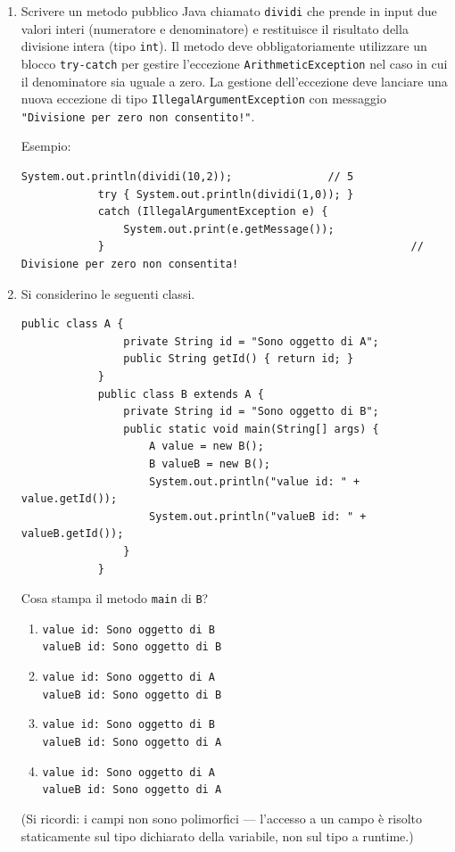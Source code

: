 	\begin{enumerate}
		
		\item Scrivere un metodo pubblico Java chiamato \texttt{dividi} che prende in input due valori interi (numeratore e denominatore) e restituisce il risultato della divisione intera (tipo \texttt{int}). Il metodo deve obbligatoriamente utilizzare un blocco \texttt{try-catch} per gestire l'eccezione \texttt{ArithmeticException} nel caso in cui il denominatore sia uguale a zero. La gestione dell'eccezione deve lanciare una nuova eccezione di tipo \texttt{IllegalArgumentException} con messaggio \texttt{"Divisione per zero non consentito!"}.
		
		Esempio:
		\begin{lstlisting}[style=java]
			System.out.println(dividi(10,2));               // 5
			try { System.out.println(dividi(1,0)); }
			catch (IllegalArgumentException e) {
				System.out.print(e.getMessage());
			}                                                // Divisione per zero non consentita!
		\end{lstlisting}
		
		\item Si considerino le seguenti classi.
		\begin{lstlisting}[style=java]
			public class A {
				private String id = "Sono oggetto di A";
				public String getId() { return id; }
			}
			public class B extends A {
				private String id = "Sono oggetto di B";
				public static void main(String[] args) {
					A value = new B();
					B valueB = new B();
					System.out.println("value id: " + value.getId());
					System.out.println("valueB id: " + valueB.getId());
				}
			}
		\end{lstlisting}
		Cosa stampa il metodo \texttt{main} di \texttt{B}?
		\begin{enumerate}[label=(\alph*)]
			\item \texttt{value id: Sono oggetto di B} \\ \texttt{valueB id: Sono oggetto di B}
			\item \texttt{value id: Sono oggetto di A} \\ \texttt{valueB id: Sono oggetto di B}
			\item \texttt{value id: Sono oggetto di B} \\ \texttt{valueB id: Sono oggetto di A}
			\item \texttt{value id: Sono oggetto di A} \\ \texttt{valueB id: Sono oggetto di A}
		\end{enumerate}
		(Si ricordi: i campi non sono polimorfici — l'accesso a un campo è risolto staticamente sul tipo dichiarato della variabile, non sul tipo a runtime.)
		

\end{enumerate}
